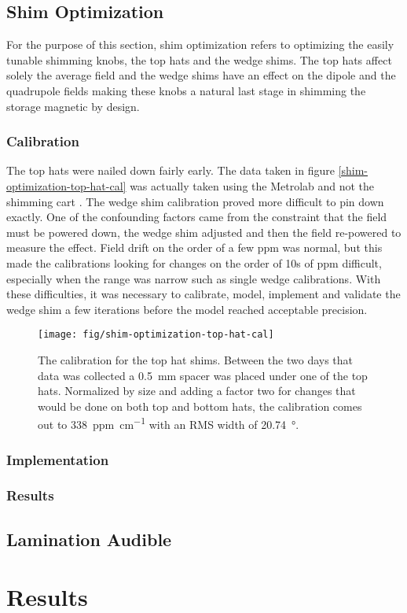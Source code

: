 \subsection{Shim Optimization}

For the purpose of this section, shim optimization refers to optimizing the easily tunable shimming knobs, the top hats and the wedge shims. The top hats affect solely the average field and the wedge shims have an effect on the dipole and the quadrupole fields making these knobs a natural last stage in shimming the storage magnetic by design.

\subsubsection{Calibration}

The top hats were nailed down fairly early.  The data taken in figure \ref{shim-optimization-top-hat-cal} was actually taken using the Metrolab and not the shimming cart .  The wedge shim calibration proved more difficult to pin down exactly.  One of the confounding factors came from the constraint that the field must be powered down, the wedge shim adjusted and then the field re-powered to measure the effect.  Field drift on the order of a few ppm was normal, but this made the calibrations looking for changes on the order of 10s of ppm difficult, especially when the range was narrow such as single wedge calibrations.  With these difficulties, it was necessary to calibrate, model, implement and validate the wedge shim a few iterations before the model reached acceptable precision.

\begin{figure}
\texttt{[image: fig/shim-optimization-top-hat-cal]}
\caption{The calibration for the top hat shims.  Between the two days that data was collected a \SI{0.5}{\milli\meter} spacer was placed under one of the top hats.  Normalized by size and adding a factor two for changes that would be done on both top and bottom hats, the calibration comes out to \SI{338}{ppm\per\centi\meter} with an RMS width of \SI{20.74}{\degree}.}
\label{fig:shim-optimization-top-hat-cal}
\end{figure}


\subsubsection{Implementation}

\subsubsection{Results}

\subsection{Lamination Audible}


\section{Results}